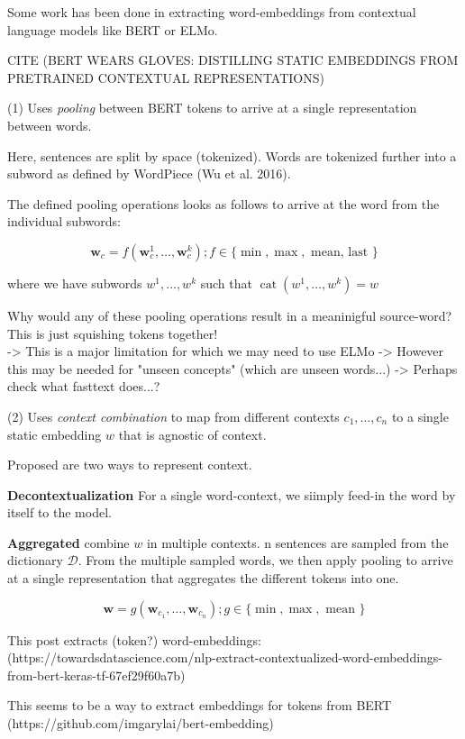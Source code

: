 \documentclass[a4paper,12pt,twoside,openright]{report}
\begin{document}
Some work has been done in extracting word-embeddings from contextual language models like BERT or ELMo.

CITE (BERT WEARS GLOVES: DISTILLING STATIC EMBEDDINGS FROM PRETRAINED CONTEXTUAL REPRESENTATIONS)

(1) Uses \textit{pooling} between BERT tokens to arrive at a single representation between words.

Here, sentences are split by space (tokenized).
Words are tokenized further into a subword as defined by WordPiece (Wu et al. 2016).

The defined pooling operations looks as follows to arrive at the word from the individual subwords:

$$
\mathbf{w}_{c}=f\left(\mathbf{w}_{c}^{1}, \ldots, \mathbf{w}_{c}^{k}\right) ; f \in\{\min , \max , \text { mean, last }\}
$$

where we have subwords $w^{1},  \ldots, w^{k}$ such that $\operatorname{cat}\left(w^{1}, \ldots, w^{k}\right)=w$

Why would any of these pooling operations result in a meaninigful source-word? 
This is just squishing tokens together! \\

-> This is a major limitation for which we may need to use ELMo
-> However this may be needed for "unseen concepts" (which are unseen words...)
-> Perhaps check what fasttext does...?


(2) Uses \textit{context combination} to map from different contexts $c_1, \ldots, c_n$ to a single static embedding $w$ that is agnostic of context.

Proposed are two ways to represent context.

\textbf{Decontextualization} For a single word-context, we siimply feed-in the word by itself to the model.

\textbf{Aggregated} combine $w$ in multiple contexts.
n sentences are sampled from the dictionary $\mathcal{D}$.
From the multiple sampled words, we then apply pooling to arrive at a single representation that aggregates the different tokens into one.

$$
\mathbf{w}=g\left(\mathbf{w}_{c_{1}}, \dots, \mathbf{w}_{c_{n}}\right) ; g \in\{\min , \max , \text { mean }\}
$$


This post extracts (token?) word-embeddings: 
(https://towardsdatascience.com/nlp-extract-contextualized-word-embeddings-from-bert-keras-tf-67ef29f60a7b)

This seems to be a way to extract embeddings for tokens from BERT
(https://github.com/imgarylai/bert-embedding)
\end{document}
